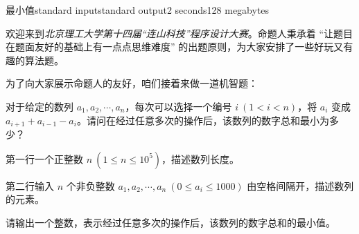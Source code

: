 \begin{problem}{最小值}{standard input}{standard output}{2 seconds}{128 megabytes}

    欢迎来到\textit{北京理工大学第十四届“连山科技”程序设计大赛}。命题人秉承着 “让题目在题面友好的基础上有一点点思维难度” 的出题原则，为大家安排了一些好玩又有趣的算法题。
    
    为了向大家展示命题人的友好，咱们接着来做一道机智题：

    对于给定的数列 $a_1,a_2,\cdots,a_n$，每次可以选择一个编号 $i\ (1<i<n)$，将 $a_i$ 变成 $a_{i+1}+a_{i−1}−a_i$。请问在经过任意多次的操作后，该数列的数字总和最小为多少？

    \InputFile

    第一行一个正整数 $n\ (1\le n\le 10^5)$，描述数列长度。

    第二行输入 $n$ 个非负整数 $a_1,a_2,\cdots, a_n\ (0\le a_i\le 1000)$ 由空格间隔开，描述数列的元素。
    
    \OutputFile
    
    请输出一个整数，表示经过任意多次的操作后，该数列的数字总和的最小值。
    
    \Example
    
    \begin{example}
    \end{example}

\end{problem}